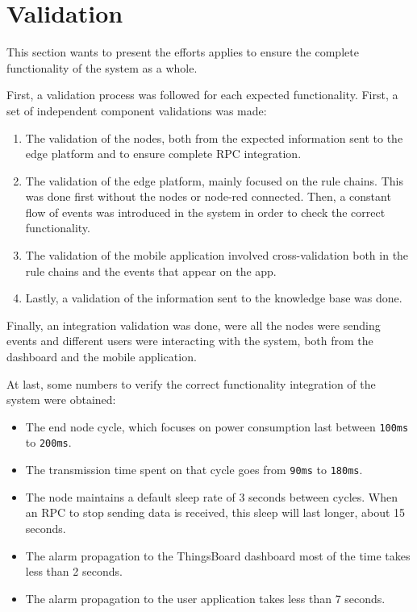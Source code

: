 \section{Validation}

This section wants to present the efforts applies to ensure the complete functionality of the system as a whole.

First, a validation process was followed for each expected functionality. First, a set of independent component validations was made:

\begin{enumerate}
    \item The validation of the nodes, both from the expected information sent to the edge platform and to ensure complete RPC integration.
    \item The validation of the edge platform, mainly focused on the rule chains. This was done first without the nodes or node-red connected. Then, a constant flow of events 
        was introduced in the system in order to check the correct functionality.
    \item The validation of the mobile application involved cross-validation both in the rule chains and the events that appear on the app.
    \item Lastly, a validation of the information sent to the knowledge base was done.
\end{enumerate}

Finally, an integration validation was done, were all the nodes were sending events and different users were interacting with the system, both from the dashboard and the mobile application.

At last, some numbers to verify the correct functionality integration of the system were obtained:
\begin{itemize}
    \item The end node cycle, which focuses on power consumption last between \texttt{100ms} to \texttt{200ms}.
    \item The transmission time spent on that cycle goes from \texttt{90ms} to \texttt{180ms}.
    \item The node maintains a default sleep rate of 3 seconds between cycles. When an RPC to stop sending data is received, this sleep will last longer, about 15 seconds.
    \item The alarm propagation to the ThingsBoard dashboard most of the time takes less than 2 seconds.
    \item The alarm propagation to the user application takes less than 7 seconds.
\end{itemize}